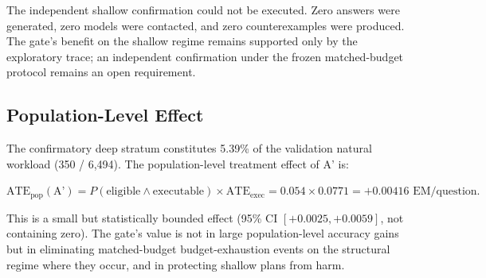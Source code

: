 The independent shallow confirmation could not be executed. Zero answers were generated, zero models were contacted, and zero counterexamples were produced. The gate's benefit on the shallow regime remains supported only by the exploratory trace; an independent confirmation under the frozen matched-budget protocol remains an open requirement.

\subsection{Population-Level Effect}\label{sec:results:population}

The confirmatory deep stratum constitutes 5.39\% of the validation natural workload (350 / 6,494). The population-level treatment effect of A' is:

$\text{ATE}_{\text{pop}}(\text{A'}) = P(\text{eligible} \wedge \text{executable}) \times \text{ATE}_{\text{exec}} = 0.054 \times 0.0771 = +0.00416 \text{ EM/question}.$

\noindent This is a small but statistically bounded effect (95\% CI $[+0.0025, +0.0059]$, not containing zero). The gate's value is not in large population-level accuracy gains but in eliminating matched-budget budget-exhaustion events on the structural regime where they occur, and in protecting shallow plans from harm.
